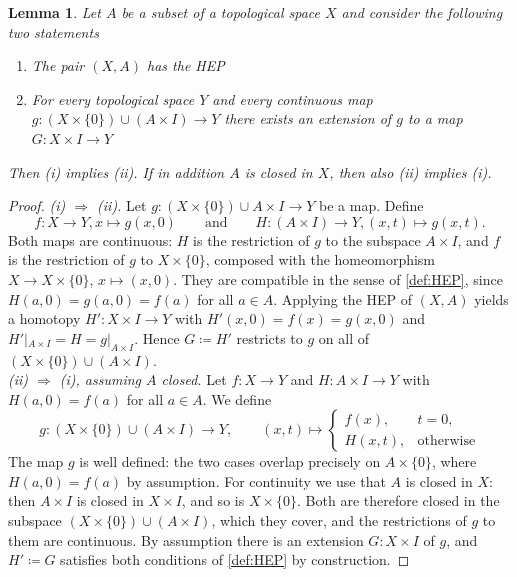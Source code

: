\documentclass[11pt, a4paper, english]{article}
\theoremstyle{plain}
\newtheorem{lemma}[theorem]{Lemma}
\theoremstyle{definition}
\theoremstyle{remark}
\numberwithin{equation}{section}
\numberwithin{theorem}{section}
\begin{document}
\begin{lemma} \label{lem:HEPextension}
    Let $A$ be a subset of a topological space $X$ and consider the following two statements
    \begin{enumerate} 
        \renewcommand{\labelenumi}{(\roman{enumi})}
        \item The pair $(X,A)$ has the \emph{HEP}
        \item For every topological space $Y$ and every continuous map $g\colon (X \times \{ 0\}) \cup (A \times I) \to Y$ there exists an extension of $g$ to a map $G \colon X \times I \to Y$
    \end{enumerate}
    Then (i) implies (ii). If in addition $A$ is closed in $X$, then also (ii) implies (i).
\end{lemma}

\begin{proof} 
    \emph{(i) $\Rightarrow$ (ii).} 
    Let $g \colon (X \times \{ 0\}) \cup A \times I \to Y$ be a map. Define
    \[ 
    f \colon X \to Y, x \mapsto g(x,0)
    \qquad\text{and}\qquad
    H \colon (A \times I) \to Y, (x,t) \mapsto g(x,t).
    \] 
    Both maps are continuous: $H$ is the restriction of $g$ to the subspace $A \times I$, and $f$ is the restriction of $g$ to $X \times \{0\}$, composed with the homeomorphism $X \to X \times \{0\}$, $x \mapsto (x,0)$. They are compatible in the sense of \cref{def:HEP}, since $H(a,0) = g(a,0) = f(a)$ for all $a \in A$. Applying the HEP of $(X,A)$ yields a homotopy $H' \colon X \times I \to Y$ with $H'(x,0) = f(x) = g(x,0)$ and $H'|_{A \times I} = H = g|_{A \times I}$. Hence $G \coloneqq H'$ restricts to $g$ on all of $(X \times \{0\}) \cup (A \times I)$. \\
    \emph{(ii) $\Rightarrow$ (i), assuming $A$ closed.}
    Let $f \colon X \to Y$ and $ H \colon A \times I \to Y$ with $H(a,0) = f(a)$ for all $a \in A$. We define
    \[
    g \colon (X \times \{ 0\}) \cup (A \times I) \rightarrow Y, 
    \qquad
    (x,t) \mapsto \begin{cases}
        f(x), & t = 0, \\
        H(x,t), & \text{otherwise}
        \end{cases}
    \]
    The map $g$ is well defined: the two cases overlap precisely on $A \times \{0\}$, where $H(a,0) = f(a)$ by assumption. For continuity we use that $A$ is closed in $X$: then $A \times I$ is closed in $X \times I$, and so is $X \times \{0\}$. Both are therefore closed in the subspace $(X \times \{0\}) \cup (A \times I)$, which they cover, and the restrictions of $g$ to them are continuous. By assumption there is an extension $G \colon X \times I$ of $g$,  and $H' \coloneqq G$ satisfies both conditions of \cref{def:HEP} by construction.
\end{proof}
\end{document}
